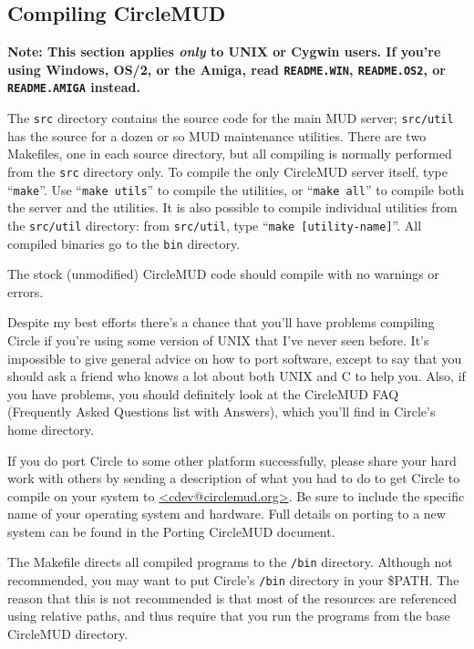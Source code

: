\documentclass[11pt]{article}
\begin{document}
\subsection{Compiling CircleMUD}
{\bf Note: This section applies {\em only} to UNIX or Cygwin users.  If you're using Windows, OS/2, or the Amiga, read \texttt{README.WIN}, \texttt{README.OS2}, or \texttt{README.AMIGA} instead.}
\par
The \texttt{src} directory contains the source code for the main MUD server; \texttt{src/util} has the source for a dozen or so MUD maintenance utilities.  There are two Makefiles, one in each source directory, but all compiling is normally performed from the \texttt{src} directory only.  To compile the only CircleMUD server itself, type ``\texttt{make}''.  Use ``\texttt{make utils}'' to compile the utilities, or ``\texttt{make all}'' to compile both the server and the utilities.  It is also possible to compile individual utilities from the \texttt{src/util} directory: from \texttt{src/util}, type ``\texttt{make [utility-name]}''.  All compiled binaries go to the \texttt{bin} directory.
\par
The stock (unmodified) CircleMUD code should compile with no warnings or errors.
\par
Despite my best efforts there's a chance that you'll have problems compiling Circle if you're using some version of UNIX that I've never seen before.  It's impossible to give general advice on how to port software, except to say that you should ask a friend who knows a lot about both UNIX and C to help you.  Also, if you have problems, you should definitely look at the CircleMUD FAQ (Frequently Asked Questions list with Answers), which you'll find in Circle's home directory.  
\par
If you do port Circle to some other platform successfully, please share your hard work with others by sending a description of what you had to do to get Circle to compile on your system to \url{<cdev@circlemud.org>}.  Be sure to include the specific name of your operating system and hardware.  Full details on porting to a new system can be found in the Porting CircleMUD document.
\par
The Makefile directs all compiled programs to the \texttt{/bin} directory.  Although not recommended, you may want to put Circle's \texttt{/bin} directory in your \$PATH.  The reason that this is not recommended is that most of the resources are referenced using relative paths, and thus require that you run the programs from the base CircleMUD directory.
\end{document}
